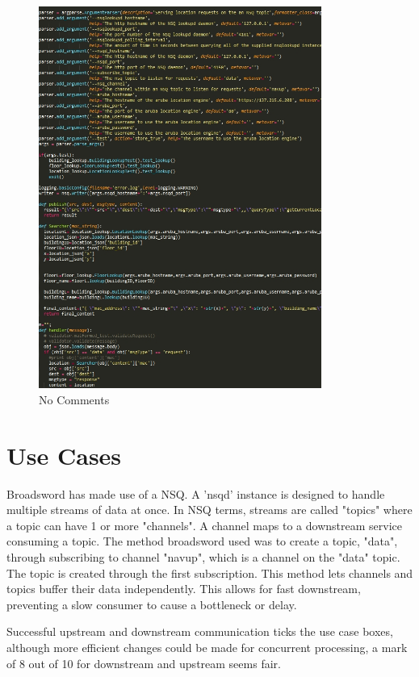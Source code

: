 \documentclass{article}
\begin{document}
\newpage
\begin{figure}[ht]
  \includegraphics[width=350px]{Images/nocomments.jpg}
  \caption{No Comments}
  \label{Figure showing the lack of comments and explanation}
\end{figure}

\newpage
\newpage
\section{Use Cases}

\begin{flushleft}
Broadsword has made use of a NSQ.
A 'nsqd' instance is designed to handle multiple streams of data at once.
In NSQ terms, streams are called "topics" where a topic can have 1 or more "channels".
A channel maps to a downstream service consuming a topic.
The method broadsword used was to create a topic, "data", through subscribing to channel "navup", which is a channel on the "data" topic. The topic is created through the first subscription.
This method lets channels and topics buffer their data independently. This allows for fast downstream, preventing a slow consumer to cause a bottleneck or delay.
\bigskip

Successful upstream and downstream communication ticks the use case boxes, although more efficient changes could be made for concurrent processing, a mark of 8 out of 10 for downstream and upstream seems fair.
\end{flushleft}
\end{document}
